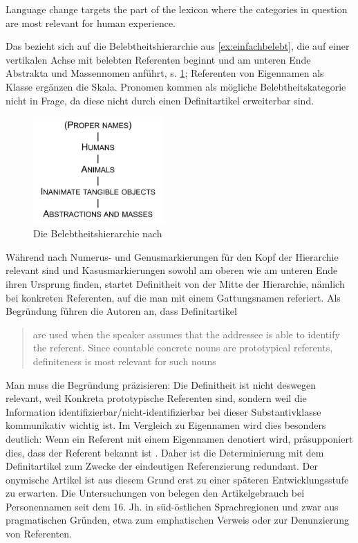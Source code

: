 \begin{exe}
	\ex \label{ex:enger} Language change targets the part of the lexicon where the categories in question are most relevant for human experience.
	\end{exe}
\noindent
Das  bezieht sich auf die Belebtheitshierarchie aus \ref{ex:einfachbelebt}, die auf einer vertikalen Achse mit belebten Referenten beginnt und am unteren Ende Abstrakta und Massennomen anführt, s. \ref{enger};  Referenten von Eigennamen als  Klasse ergänzen die Skala. Pronomen kommen als mögliche Belebtheitskategorie nicht in Frage, da diese nicht durch einen Definitartikel erweiterbar sind. 

\begin{figure}[h]
\begin{center}
\includegraphics[width=5cm]{images/enger-hierarchie.jpg}
\caption {Die Belebtheitshierarchie nach \textcite{Enger2011}}
\label{enger}
\end{center}
\end{figure} 
	

Während nach \textcite[206ff.]{Enger2011} Numerus- und Genusmarkierungen für den Kopf der Hierarchie relevant sind und Kasusmarkierungen sowohl am oberen wie am unteren Ende ihren Ursprung finden, startet Definitheit von der Mitte der Hierarchie, nämlich bei konkreten Referenten, auf die man mit einem Gattungsnamen referiert.  Als Begründung führen die Autoren an, dass Definitartikel \blockcquote[205]{Enger2011}[.]{are used when the speaker assumes that the addressee is able to identify the referent. Since countable concrete nouns are prototypical referents, definiteness is most relevant for such nouns}. Man muss die Begründung präzisieren: Die Definitheit ist nicht deswegen relevant, weil Konkreta prototypische Referenten sind, sondern weil die Information identifizierbar/nicht-identifizierbar bei dieser Substantivklasse kommunikativ wichtig ist. Im Vergleich zu Eigennamen wird dies besonders deutlich: Wenn ein Referent mit einem Eigennamen denotiert wird, präsupponiert dies, dass der Referent bekannt ist \parencite[997]{Heim2011}. Daher ist die Determinierung mit dem Definitartikel zum Zwecke der eindeutigen Referenzierung redundant. Der onymische Artikel ist aus diesem Grund erst zu einer späteren Entwicklungsstufe zu erwarten. Die Untersuchungen von \textcite{Schmuck2014,Schmuck2020} belegen den Artikelgebrauch bei Personennamen seit dem 16. Jh. in süd-östlichen Sprachregionen und zwar aus pragmatischen Gründen, etwa zum emphatischen Verweis oder zur Denunzierung von Referenten.

